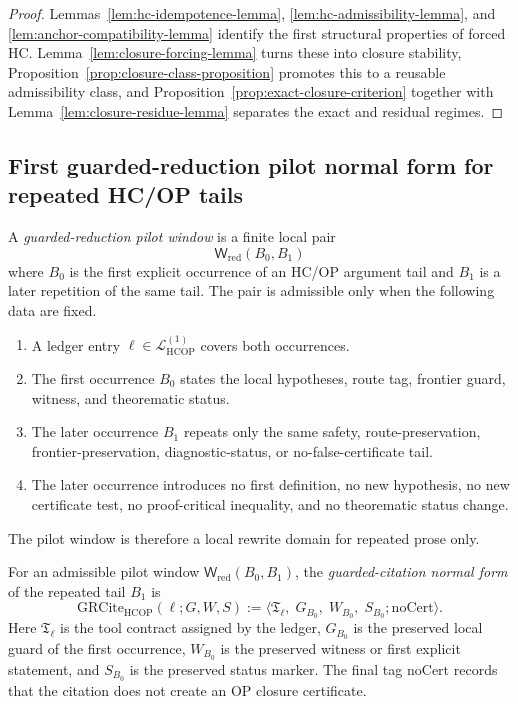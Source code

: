 \begin{proof}
Lemmas~\ref{lem:hc-idempotence-lemma},
\ref{lem:hc-admissibility-lemma}, and
\ref{lem:anchor-compatibility-lemma} identify the first structural properties of
forced HC. Lemma~\ref{lem:closure-forcing-lemma} turns these into closure
stability, Proposition~\ref{prop:closure-class-proposition} promotes this to a
reusable admissibility class, and
Proposition~\ref{prop:exact-closure-criterion} together with
Lemma~\ref{lem:closure-residue-lemma} separates the exact and residual regimes.
\end{proof}



\subsection{First guarded-reduction pilot normal form for repeated HC/OP tails}
\label{subsec:first-guarded-reduction-pilot-normal-form-repeated-hcop-tails}

\begin{definition}
\label{def:guarded-reduction-pilot-window}
A \emph{guarded-reduction pilot window} is a finite local pair
\[
 \mathsf W_{\mathrm{red}}(B_0,B_1)
\]
where \(B_0\) is the first explicit occurrence of an HC/OP argument tail and \(B_1\) is a later repetition of the same tail. The pair is admissible only when the following data are fixed.
\begin{enumerate}[leftmargin=2em,label=(\roman*)]
 \item A ledger entry \(\ell\in\mathcal L_{\mathrm{HCOP}}^{(1)}\) covers both occurrences.
 \item The first occurrence \(B_0\) states the local hypotheses, route tag, frontier guard, witness, and theorematic status.
 \item The later occurrence \(B_1\) repeats only the same safety, route-preservation, frontier-preservation, diagnostic-status, or no-false-certificate tail.
 \item The later occurrence introduces no first definition, no new hypothesis, no new certificate test, no proof-critical inequality, and no theorematic status change.
\end{enumerate}
The pilot window is therefore a local rewrite domain for repeated prose only.
\end{definition}

\begin{definition}
\label{def:r13-guarded-citation-normal-form}
For an admissible pilot window \(\mathsf W_{\mathrm{red}}(B_0,B_1)\), the \emph{guarded-citation normal form} of the repeated tail \(B_1\) is
\[
 \mathrm{GRCite}_{\mathrm{HCOP}}(\ell;G,W,S)
 :=
 \bigl\langle
 \mathfrak T_{\ell},\;G_{B_0},\;W_{B_0},\;S_{B_0};\mathrm{noCert}
 \bigr\rangle .
\]
Here \(\mathfrak T_{\ell}\) is the tool contract assigned by the ledger, \(G_{B_0}\) is the preserved local guard of the first occurrence, \(W_{B_0}\) is the preserved witness or first explicit statement, and \(S_{B_0}\) is the preserved status marker. The final tag \(\mathrm{noCert}\) records that the citation does not create an OP closure certificate.
\end{definition}

